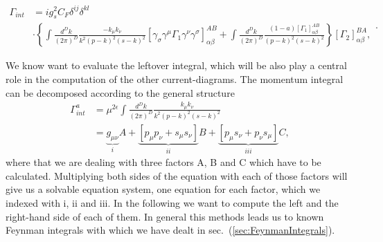 	\begin{equation}
		\label{eq:aPreIntegralGreensFunction}
		\begin{split}
			\Gamma_{int} &= ig_s^2 C_F \delta^{ij} \delta^{kl}  \\
			&\cdot\left\{ \int \frac{d^Dk}{(2\pi)^D}\frac{-k_\mu k_\nu}{k^2(p-k)^2(s-k)^2} \left[ \gamma_\sigma \gamma^\mu \Gamma_1 \gamma^\nu \gamma^\sigma \right]^{AB}_{\alpha\beta} + \int \frac{d^Dk}{(2\pi)^D} \frac{(1-a)\left[\Gamma_1\right]^{AB}_{\alpha\beta}}{(p-k)^2(s-k)^2}\right\} \left[ \Gamma_2\right]^{BA}_{\alpha\beta}, 
		\end{split}.
	\end{equation} \par	
	We know want to evaluate the leftover integral, which will be also play a central role in the computation of the other current-diagrams. The momentum integral can be decomposed according to the general structure 
	\begin{equation} 
		\label{eq:1DiagramIntegralEquation}
		\begin{split}
			\Gamma^a_{int} &=	\mu^{2\epsilon}\int\frac{d^D k}{(2\pi)^D}\frac{k_\mu k_\nu}{k^2(p-k)^2(s-k)^2} \\
			&= \underbrace{g_{\mu\nu}}_{i}A + \underbrace{[p_\mu p_\nu + s_\mu s_\nu]}_{ii}B + \underbrace{[p_\mu s_\nu + p_\nu s_\mu]}_{iii}C ,
		\end{split}
	\end{equation}
where that we are dealing with three factors A, B and C which have to be calculated. Multiplying both sides of the equation with each of those factors will give us a solvable equation system, one equation for each factor, which we indexed with i, ii and iii. In the following we want to compute the left and the right-hand side of each of them. In general this methods leads us to known Feynman integrals with which we have dealt in sec.~(\ref{sec:FeynmanIntegrals}). 
